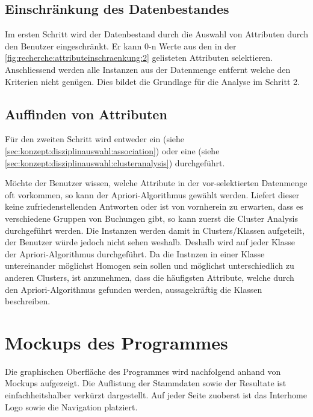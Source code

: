 \subsection{Einschränkung des Datenbestandes}
Im ersten Schritt wird der Datenbestand durch die Auswahl von Attributen durch den Benutzer eingeschränkt. Er kann 0-n Werte aus den in der \cref{fig:recherche:attributeinschraenkung:2} gelisteten Attributen selektieren. Anschliessend werden alle Instanzen aus der Datenmenge entfernt welche den Kriterien nicht genügen. Dies bildet die Grundlage für die Analyse im Schritt 2.

\subsection{Auffinden von Attributen}
Für den zweiten Schritt wird entweder ein  (siehe \cref{sec:konzept:disziplinauswahl:association}) oder eine  (siehe \cref{sec:konzept:disziplinauswahl:clusteranalysis}) durchgeführt. 

Möchte der Benutzer wissen, welche Attribute in der vor-selektierten Datenmenge oft vorkommen, so kann der Apriori-Algorithmus gewählt werden. Liefert dieser keine zufriedenstellenden Antworten oder ist von vornherein zu erwarten, dass es verschiedene Gruppen von Buchungen gibt, so kann zuerst die Cluster Analysis durchgeführt werden. Die Instanzen werden damit in Clusters/Klassen aufgeteilt, der Benutzer würde jedoch nicht sehen weshalb. Deshalb wird auf jeder Klasse der Apriori-Algorithmus durchgeführt. Da die Instnzen in einer Klasse untereinander möglichst Homogen sein sollen und möglichst unterschiedlich zu anderen Clusters, ist anzunehmen, dass die häufigsten Attribute, welche durch den Apriori-Algorithmus gefunden werden, aussagekräftig die Klassen beschreiben.

\section{Mockups des Programmes}
\label{sec:konzept:mockups}
Die graphischen Oberfläche des Programmes wird nachfolgend anhand von Mockups aufgezeigt. Die Auflistung der Stammdaten sowie der Resultate ist einfachheitshalber verkürzt dargestellt. Auf jeder Seite zuoberst ist das Interhome Logo sowie die Navigation platziert.

